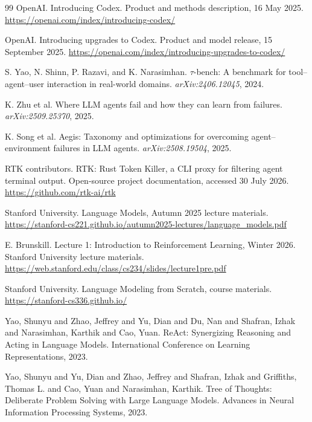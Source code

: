 \documentclass[11pt,a4paper]{article}
\begin{document}
\begin{thebibliography}{99}
OpenAI.
\newblock Introducing Codex.
\newblock Product and methods description, 16 May 2025. \url{https://openai.com/index/introducing-codex/}

OpenAI.
\newblock Introducing upgrades to Codex.
\newblock Product and model release, 15 September 2025. \url{https://openai.com/index/introducing-upgrades-to-codex/}

S. Yao, N. Shinn, P. Razavi, and K. Narasimhan.
\newblock $\tau$-bench: A benchmark for tool--agent--user interaction in real-world domains.
\newblock \emph{arXiv:2406.12045}, 2024.

K. Zhu et al.
\newblock Where LLM agents fail and how they can learn from failures.
\newblock \emph{arXiv:2509.25370}, 2025.

K. Song et al.
\newblock Aegis: Taxonomy and optimizations for overcoming agent--environment failures in LLM agents.
\newblock \emph{arXiv:2508.19504}, 2025.

RTK contributors.
\newblock RTK: Rust Token Killer, a CLI proxy for filtering agent terminal output.
\newblock Open-source project documentation, accessed 30 July 2026. \url{https://github.com/rtk-ai/rtk}

Stanford University.
\newblock Language Models, Autumn 2025 lecture materials.
\newblock \url{https://stanford-cs221.github.io/autumn2025-lectures/language_models.pdf}

E. Brunskill.
\newblock Lecture 1: Introduction to Reinforcement Learning, Winter 2026.
\newblock Stanford University lecture materials. \url{https://web.stanford.edu/class/cs234/slides/lecture1pre.pdf}

Stanford University.
\newblock Language Modeling from Scratch, course materials.
\newblock \url{https://stanford-cs336.github.io/}


Yao, Shunyu and Zhao, Jeffrey and Yu, Dian and Du, Nan and Shafran, Izhak and Narasimhan, Karthik and Cao, Yuan.
\newblock ReAct: Synergizing Reasoning and Acting in Language Models.
\newblock International Conference on Learning Representations, 2023.

Yao, Shunyu and Yu, Dian and Zhao, Jeffrey and Shafran, Izhak and Griffiths, Thomas L. and Cao, Yuan and Narasimhan, Karthik.
\newblock Tree of Thoughts: Deliberate Problem Solving with Large Language Models.
\newblock Advances in Neural Information Processing Systems, 2023.


\end{thebibliography}
\end{document}

